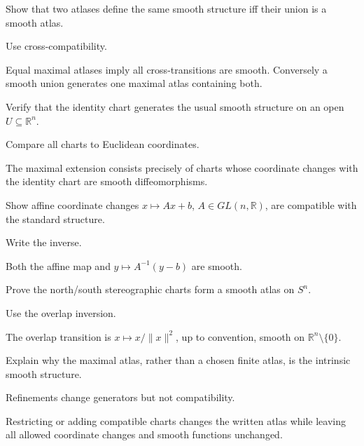 \begin{exercise}\label{exr:vii02-05}
Show that two atlases define the same smooth structure iff their union is a smooth atlas.
\end{exercise}
\begin{hint}
Use cross-compatibility.
\end{hint}
\begin{solution}
Equal maximal atlases imply all cross-transitions are smooth. Conversely a smooth union generates one maximal atlas containing both.
\end{solution}

\begin{exercise}\label{exr:vii02-06}
Verify that the identity chart generates the usual smooth structure on an open \(U\subseteq\mathbb R^n\).
\end{exercise}
\begin{hint}
Compare all charts to Euclidean coordinates.
\end{hint}
\begin{solution}
The maximal extension consists precisely of charts whose coordinate changes with the identity chart are smooth diffeomorphisms.
\end{solution}

\begin{exercise}\label{exr:vii02-07}
Show affine coordinate changes \(x\mapsto Ax+b\), \(A\in GL(n,\mathbb R)\), are compatible with the standard structure.
\end{exercise}
\begin{hint}
Write the inverse.
\end{hint}
\begin{solution}
Both the affine map and \(y\mapsto A^{-1}(y-b)\) are smooth.
\end{solution}

\begin{exercise}\label{exr:vii02-08}
Prove the north/south stereographic charts form a smooth atlas on \(S^n\).
\end{exercise}
\begin{hint}
Use the overlap inversion.
\end{hint}
\begin{solution}
The overlap transition is \(x\mapsto x/\|x\|^2\), up to convention, smooth on \(\mathbb R^n\setminus\{0\}\).
\end{solution}

\begin{exercise}\label{exr:vii02-09}
Explain why the maximal atlas, rather than a chosen finite atlas, is the intrinsic smooth structure.
\end{exercise}
\begin{hint}
Refinements change generators but not compatibility.
\end{hint}
\begin{solution}
Restricting or adding compatible charts changes the written atlas while leaving all allowed coordinate changes and smooth functions unchanged.
\end{solution}

